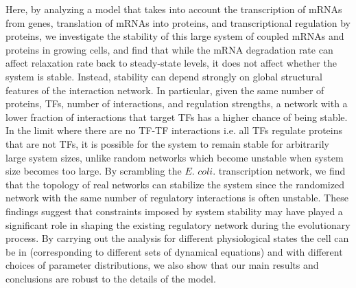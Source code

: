 \documentclass[10pt]{article}
\begin{document}
Here, by analyzing a model that takes into account the transcription of mRNAs from genes, translation of mRNAs into proteins, and transcriptional regulation by proteins, we investigate the stability of this large system of coupled mRNAs and proteins in growing cells, and find that while the mRNA degradation rate can affect relaxation rate back to steady-state levels, it does not affect whether the system is stable. Instead, stability can depend strongly on global structural features of the interaction network. In particular, given the same number of proteins, TFs, number of interactions, and regulation strengths, a network with a lower fraction of interactions that target TFs has a higher chance of being stable. In the limit where there are no TF-TF interactions i.e. all TFs regulate proteins that are not TFs, it is possible for the system to remain stable for arbitrarily large system sizes, unlike random networks which become unstable when system size becomes too large. By scrambling the $\textit{E. coli.}$ transcription network, we find that the topology of real networks can stabilize the system since the randomized network with the same number of regulatory interactions is often unstable. These findings suggest that constraints imposed by system stability may have played a significant role in shaping the existing regulatory network during the evolutionary process. By carrying out the analysis for different physiological states the cell can be in (corresponding to different sets of dynamical equations) and with different choices of parameter distributions, we also show that our main results and conclusions are robust to the details of the model.


\end{document}
